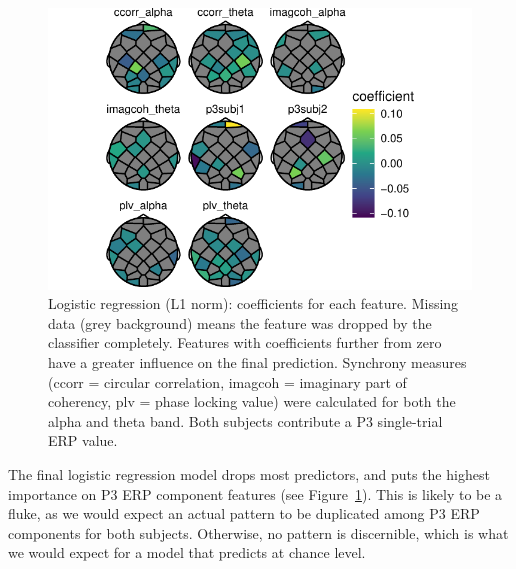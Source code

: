 \begin{figure}[!htpb]
  \includegraphics[width=\linewidth]{../stats/results/logistic_coef.pdf}
  \caption{Logistic regression (L1 norm): coefficients for each feature. Missing data  (grey background) means the feature was dropped by the classifier completely. Features with coefficients further from zero have a greater influence on the final prediction. Synchrony measures (ccorr = circular correlation, imagcoh = imaginary part of coherency, plv = phase locking value) were calculated for both the alpha and theta band. Both subjects contribute a P3 single-trial ERP value.}
  \label{fig:logistic_coef}
\end{figure}

The final logistic regression model drops most predictors, and puts the highest
importance on P3 ERP component features (see Figure~\ref{fig:logistic_coef}).
This is likely to be a fluke, as we would expect an actual pattern to be
duplicated among P3 ERP components for both subjects. Otherwise, no pattern is
discernible, which is what we would expect for a model that predicts at chance
level.


